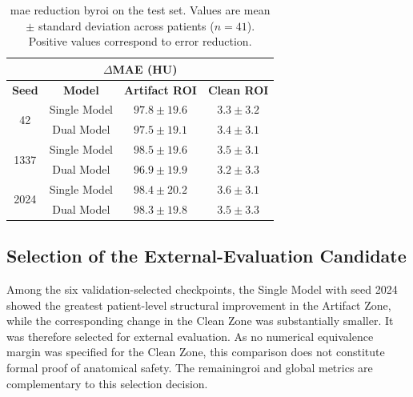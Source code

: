 \begin{table}[htbp]
    \centering
    \small
    \begin{tabular}{cccc}
        \multicolumn{4}{c}{\textbf{$\Delta$MAE (HU)}} \\[4pt]
        \hline
        \textbf{Seed} & \textbf{Model} & \textbf{Artifact ROI} & \textbf{Clean ROI} \\
        \hline
        \multirow{2}{*}{42} & Single Model & $97.8 \pm 19.6$ & $3.3 \pm 3.2$ \\
                             & Dual Model   & $97.5 \pm 19.1$ & $3.4 \pm 3.1$ \\
        \hline
        \multirow{2}{*}{1337} & Single Model & $98.5 \pm 19.6$ & $3.5 \pm 3.1$ \\
                               & Dual Model   & $96.9 \pm 19.9$ & $3.2 \pm 3.3$ \\
        \hline
        \multirow{2}{*}{2024} & Single Model & $98.4 \pm 20.2$ & $3.6 \pm 3.1$ \\
                               & Dual Model   & $98.3 \pm 19.8$ & $3.5 \pm 3.3$ \\
        \hline
    \end{tabular}
    \captionsetup{skip=2pt}
    \caption[ROI MAE reduction]{\acrshort{mae} reduction by\acrshort{roi} on the test set. Values are mean $\pm$ standard deviation across patients ($n=41$). Positive values correspond to error reduction.}
    \label{tab:roi-reducao-mae}
\end{table}
\FloatBarrier

\subsection{Selection of the External-Evaluation Candidate}
\label{sec:external-candidate-selection}

Among the six validation-selected checkpoints, the Single Model with seed 2024 showed the greatest patient-level structural improvement in the Artifact Zone, while the corresponding change in the Clean Zone was substantially smaller. It was therefore selected for external evaluation. As no numerical equivalence margin was specified for the Clean Zone, this comparison does not constitute formal proof of anatomical safety. The remaining\acrshort{roi} and global metrics are complementary to this selection decision.

